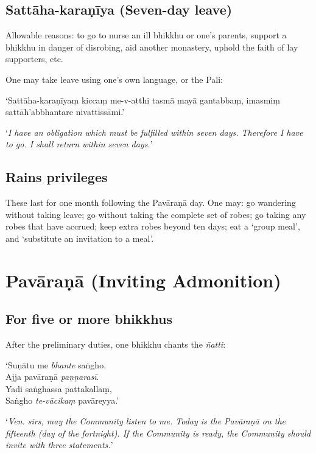 \subsection{Sattāha-karaṇīya (Seven-day leave)}

Allowable reasons: to go to nurse an ill bhikkhu or one's parents, support a
bhikkhu in danger of disrobing, aid another monastery, uphold the faith of lay
supporters, etc.

One may take leave using one's own language, or the Pali:

‘Sattāha-karaṇīyaṃ kiccaṃ me-v-atthi tasmā mayā gantabbaṃ, imasmiṃ
sattāh'abbhantare nivattissāmi.’

‘\emph{I have an obligation which must be fulfilled within seven days. Therefore
  I have to go. I shall return within seven days.}’\\
\mbox{}

\subsection{Rains privileges}

These last for one month following the Pavāraṇā day. One may: go wandering
without taking leave; go without taking the complete set of robes; go taking any
robes that have accrued; keep extra robes beyond ten days; eat a ‘group meal’,
and ‘substitute an invitation to a meal’.

\section{Pavāraṇā (Inviting Admonition)}

\subsection{For five or more bhikkhus}

After the preliminary duties, one bhikkhu chants the \emph{ñatti}:

\vspace*{\parskip}

\begin{paritta}
‘Suṇātu me \emph{bhante} saṅgho.\\
Ajja pavāraṇā \emph{paṇṇarasī}.\\
Yadi saṅghassa pattakallaṃ,\\
Saṅgho \emph{te-vācikaṃ} pavāreyya.’
\end{paritta}

‘\emph{Ven. sirs, may the Community listen to me. Today is the Pavāraṇā on the
  fifteenth (day of the fortnight). If the Community is ready, the Community
  should invite with three statements.}’

